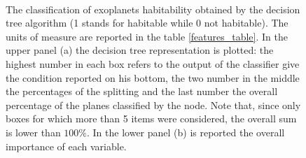 \documentclass[
12pt, %
a4paper, %
oneside, %
headinclude,footinclude, %
BCOR5mm, %
]{scrartcl}
\begin{document}
\begin{figure}[h]
 \centering
\begin{center}
\\
\caption{The classification of exoplanets habitability obtained by the decision tree algorithm (1 stands for habitable while 0 not habitable). The units of measure are reported in the table \ref{features_table}. In the  upper panel (a) the decision tree representation is plotted: the highest number in each box refers to the output of the classifier give the condition reported on his bottom, the two number in the middle the percentages of the splitting and the last number the overall percentage of the planes classified by the node. Note that, since only boxes for which more than 5 items were considered, the overall sum is lower than $100 \%$. In the lower panel (b) is reported the overall importance of each variable.}
\label{DecisionTree}
\end{center}
\end{figure}
\end{document}
